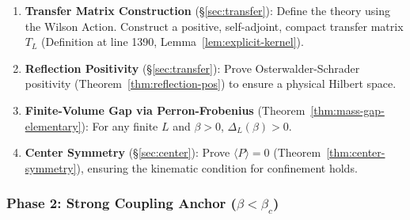 \begin{enumerate}
\item \textbf{Transfer Matrix Construction} (\S\ref{sec:transfer}): 
Define the theory using the Wilson Action. Construct a positive, self-adjoint, 
compact transfer matrix $T_L$ (Definition at line 1390, Lemma~\ref{lem:explicit-kernel}).
\begin{center}
\end{center}

\item \textbf{Reflection Positivity} (\S\ref{sec:transfer}): 
Prove Osterwalder-Schrader positivity (Theorem~\ref{thm:reflection-pos}) to ensure 
a physical Hilbert space.
\begin{center}
\end{center}

\item \textbf{Finite-Volume Gap via Perron-Frobenius} (Theorem~\ref{thm:mass-gap-elementary}): 
For any finite $L$ and $\beta > 0$, $\Delta_L(\beta) > 0$.
\begin{center}
\end{center}

\item \textbf{Center Symmetry} (\S\ref{sec:center}): 
Prove $\langle P \rangle = 0$ (Theorem~\ref{thm:center-symmetry}), ensuring the 
kinematic condition for confinement holds.
\begin{center}
\end{center}
\end{enumerate}

\subsubsection{Phase 2: Strong Coupling Anchor (\texorpdfstring{$\beta < \beta_c$}{beta < beta\_c})}

